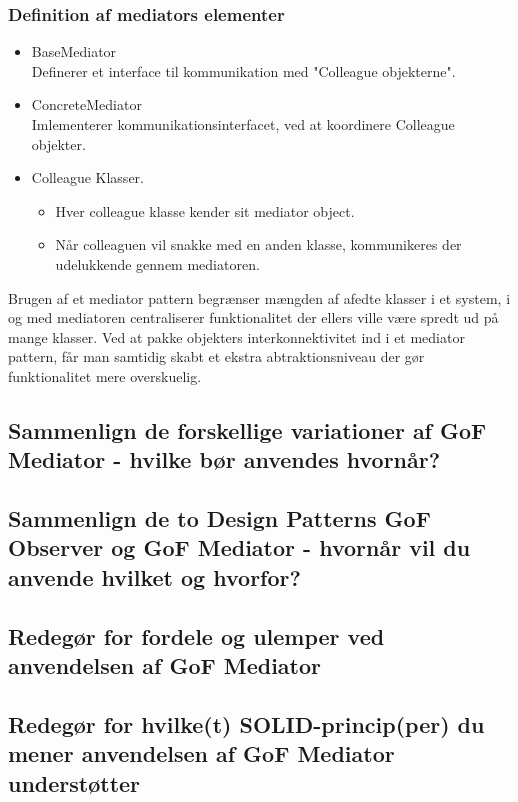 \subsubsection{Definition af mediators elementer}
\begin{itemize}
	\item BaseMediator\\
	Definerer et interface til kommunikation med "Colleague objekterne".
	\item ConcreteMediator\\
	Imlementerer kommunikationsinterfacet, ved at koordinere Colleague objekter.
	\item Colleague Klasser.
	\begin{itemize}
		\item Hver colleague klasse kender sit mediator object.
		\item Når colleaguen vil snakke med en anden klasse, kommunikeres der udelukkende gennem
		mediatoren.
	\end{itemize}
\end{itemize}

Brugen af et mediator pattern begrænser mængden af afedte klasser i et system, i og med
mediatoren centraliserer funktionalitet der ellers ville være spredt ud på mange klasser. Ved at
pakke objekters interkonnektivitet ind i et mediator pattern, får man samtidig skabt et ekstra
abtraktionsniveau der gør funktionalitet mere overskuelig.

\subsection{Sammenlign de forskellige variationer af GoF Mediator - hvilke bør anvendes hvornår?}

\subsection{Sammenlign de to Design Patterns GoF Observer og GoF Mediator - hvornår vil du anvende hvilket og hvorfor?}

\subsection{Redegør for fordele og ulemper ved anvendelsen af GoF Mediator}

\subsection{Redegør for hvilke(t) SOLID-princip(per) du mener anvendelsen af GoF Mediator understøtter}